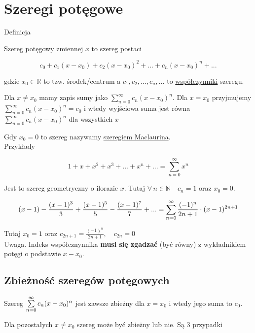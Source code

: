 \section{Szeregi potęgowe}

Definicja

Szereg potęgowy zmiennej $x$ to szereg postaci

$$ c_0 + c_1(x - x_0) + c_2(x- x_0)^2 + ... + c_n(x - x_0)^n + ... $$

gdzie $x_0 \in \mathbb{R} $ to tzw. środek/centrum a $ c_1, c_2, ..., c_n, ... $ to \underline{współczynniki} szeregu.

Dla $x \neq x_0$ mamy zapis sumy jako $ \sum\limits_{n = 0}^{\infty} c_n(x - x_0)^n $. Dla $x = x_0$ przyjmujemy
$ \sum\limits_{n = 0}^{\infty} c_n(x - x_0)^n = c_0 $ i wtedy wyjściowa suma jest równa $ \sum\limits_{n = 0}^{\infty} c_n(x - x_0)^n $
dla wszystkich $x$

Gdy $x_0 = 0$ to szereg nazywamy \underline{szeregiem Maclaurina}. \\

Przykłady

$$ 1 + x + x^2 + x^3 + ... + x^n + ... = \sum\limits_{n = 0}^{\infty} x^n $$

Jest to szereg geometryczny o ilorazie $x$. Tutaj $ \forall \, n \in \mathbb{N} \quad c_n = 1 $ oraz $x_0 = 0$.

$$ (x - 1) - \frac{(x-1)^3}{3} + \frac{(x-1)^5}{5} - \frac{(x-1)^7}{7} + ... 
= \sum\limits_{n = 0}^{\infty} \frac{ (-1)^n }{ 2n+1 } \cdot (x-1)^{2n+1} $$

Tutaj $x_0 = 1$ oraz $ c_{2n+1} = \frac{ (-1)^n }{ 2n+1 }, \quad c_{2n} = 0 $ \\

Uwaga. Indeks współcznynnika \textbf{musi się zgadzać} (być równy) z wykładnikiem potęgi o podstawie $x-x_0$.


\subsection*{Zbieżność szeregów potęgowych}

Szereg $ \sum\limits_{n = 0}^{\infty} c_n(x-x_0)^n $ jest zawsze zbieżny dla $x=x_0$ i wtedy jego suma to $c_0$.

Dla pozostałych $x \neq x_0$ szereg może być zbieżny lub nie. Są 3 przypadki


